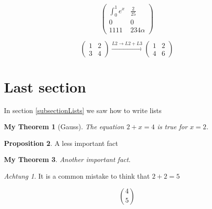 \documentclass[10pt,a4paper]{article}
\newtheorem{mythm}{My Theorem}[section]
\theoremstyle{definition}
\newtheorem{prop}[mythm]{Proposition}
\theoremstyle{remark}
\newtheorem*{warning}{Achtung}
\begin{document}
\[
	\begin{pmatrix}
		\int_0^1 e^x  &  \frac{2}{25} \\
		0 & 0 \\
		1111 & 234\alpha
	\end{pmatrix}
\]

\[
\begin{pmatrix}
1 & 2\\
3 & 4
\end{pmatrix}
\overset{L2\rightarrow L2+L3}\longrightarrow
\begin{pmatrix}
1 & 2\\
4 & 6
\end{pmatrix}
\]

\section{Last section}

In section \ref{subsectionLists} we saw how to write lists

\begin{mythm}[Gauss]
The equation \(2+x=4\) is true for \(x=2\).
\end{mythm}

\begin{prop}
A less important fact
\end{prop}

\begin{mythm}
Another important fact.
\end{mythm}

\begin{warning}
It is a common mistake to think that \(2+2=5\)
\end{warning}
\[\binom45\]
\end{document}
